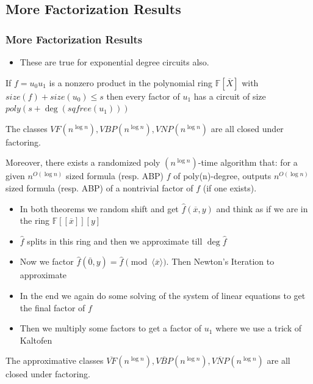 \documentclass[10pt]{beamer}
\begin{document}
\subsection{More Factorization Results}
\begin{frame}[allowframebreaks]
	\frametitle{More Factorization Results}
 \begin{itemize}
     \item These are true for exponential degree circuits also.
 \end{itemize}
 
	\begin{theorem}
	    If $f=u_0u_1$ is a nonzero product in the polynomial ring $\mathbb{F}[\overline{X}]$ with $size(f)+size(u_0)\leq s$ then every factor  of $u_1$ has a circuit of size $poly(s+\deg(sqfree(u_1)))$
	\end{theorem}
 
	\begin{theorem}
		The classes $V F\left(n^{\log n}\right), V B P\left(n^{\log n}\right), V N P\left(n^{\log n}\right)$ are all closed under factoring.
  
Moreover, there exists a randomized poly $\left(n^{\log n}\right)$-time algorithm that: for a given $n^{O(\log n)}$ sized formula (resp. ABP) $f$ of poly(n)-degree, outputs $n^{O(\log n)}$ sized formula (resp. ABP) of a nontrivial factor of $f$ (if one exists).
	\end{theorem}
	\framebreak
 
	\begin{itemize}
	    \item In both theorems we random shift and get $\hat{f}(\overline{x},y)$ and think as if we are in the ring $\mathbb{F}[[\overline{x}]][y]$ 
     \item $\hat{f}$ splits in this ring and then we approximate till $\deg \hat{f}$
     \item Now we factor $\hat{f}(\overline{0},y)=\hat{f}\pmod {\langle \overline{x}\rangle}$. Then Newton's Iteration to approximate 
     \item In the end we again do some solving of the system of linear equations to get the final factor of $f$ 
     \item Then we multiply some factors to get a factor of $u_1$ where we use a trick of Kaltofen
	\end{itemize}
 \begin{theorem}
     The approximative classes $\overline{V F}\left(n^{\log n}\right), \overline{V B P}\left(n^{\log n}\right), \overline{V N P}\left(n^{\log n}\right)$ are all closed under factoring.
 \end{theorem}
\end{frame}
\end{document}
